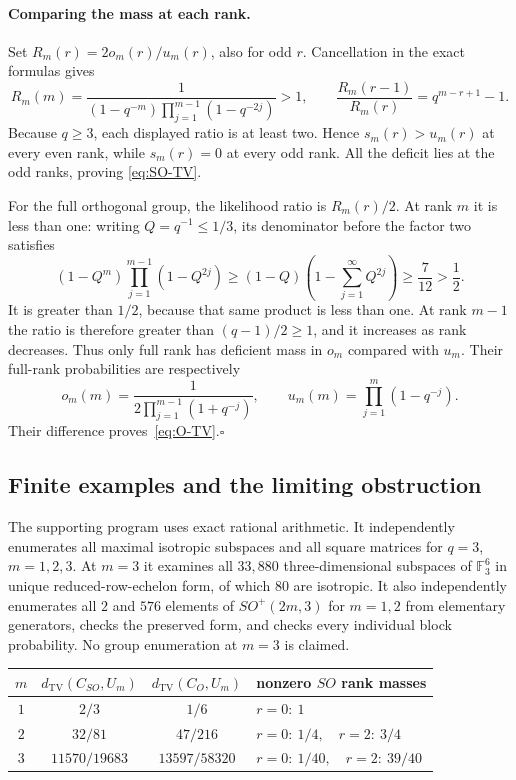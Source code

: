\paragraph{Comparing the mass at each rank.}
Set $R_m(r)=2o_m(r)/u_m(r)$, also for odd $r$. Cancellation in the exact
formulas gives
\[
 R_m(m)=\frac{1}{(1-q^{-m})
                      \prod_{j=1}^{m-1}(1-q^{-2j})}>1,
 \qquad
 \frac{R_m(r-1)}{R_m(r)}=q^{m-r+1}-1.
\]
Because $q\ge3$, each displayed ratio is at least two.
Hence $s_m(r)>u_m(r)$ at every even rank, while $s_m(r)=0$ at every
odd rank. All the deficit lies at the odd ranks, proving
\eqref{eq:SO-TV}.

For the full orthogonal group, the likelihood ratio is $R_m(r)/2$.
At rank $m$ it is less than one: writing $Q=q^{-1}\le1/3$, its
denominator before the factor two satisfies
\[
 (1-Q^m)\prod_{j=1}^{m-1}(1-Q^{2j})
 \ge (1-Q)\left(1-\sum_{j=1}^{\infty}Q^{2j}\right)
 \ge \frac{7}{12}>\frac12.
\]
It is greater than $1/2$, because that same product is less than one.
At rank $m-1$ the ratio is therefore greater than
$(q-1)/2\ge1$, and it increases as rank decreases.
Thus only full rank has deficient mass in $o_m$ compared with $u_m$.
Their full-rank probabilities are respectively
\[
 o_m(m)=\frac{1}{2\prod_{j=1}^{m-1}(1+q^{-j})},\qquad
 u_m(m)=\prod_{j=1}^{m}(1-q^{-j}).
\]
Their difference proves~\eqref{eq:O-TV}.\hfill$\square$

\subsection{Finite examples and the limiting obstruction}

The supporting program  uses exact rational
arithmetic. It independently enumerates all maximal isotropic subspaces
and all square matrices for $q=3$, $m=1,2,3$. At $m=3$ it examines all
$33{,}880$ three-dimensional subspaces of $\mathbb F_3^6$ in unique
reduced-row-echelon form, of which $80$ are isotropic. It also independently
enumerates all $2$ and $576$ elements of $SO^+(2m,3)$ for $m=1,2$ from
elementary generators, checks the preserved form, and checks every
individual block probability. No group enumeration at $m=3$ is claimed.

\begin{center}
\begin{tabular}{c|c|c|l}
 $m$ & $d_{\mathrm{TV}}(C_{SO},U_m)$ &
       $d_{\mathrm{TV}}(C_O,U_m)$ & nonzero $SO$ rank masses\\\hline
 $1$ & $2/3$ & $1/6$ & $r=0:\ 1$\\
 $2$ & $32/81$ & $47/216$ & $r=0:\ 1/4,\quad r=2:\ 3/4$\\
 $3$ & $11570/19683$ & $13597/58320$ &
       $r=0:\ 1/40,\quad r=2:\ 39/40$
\end{tabular}
\end{center}

